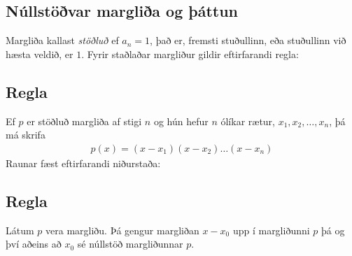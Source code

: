 \documentclass[a4paper,10pt,icelandic]{sphinxmanual}
\begin{document}
\subsection{Núllstöðvar margliða og þáttun}
\label{\detokenize{Kafli06:nullstovar-marglia-og-attun}}
Margliða kallast \textit{stöðluð} ef \(a_n=1\), það er, fremsti stuðullinn, eða stuðullinn við hæsta veldið, er \(1\). Fyrir staðlaðar margliður gildir eftirfarandi regla:


\subsection{Regla}
\label{\detokenize{Kafli06:id3}}
Ef \(p\) er stöðluð margliða af stigi \(n\) og hún hefur \(n\) ólíkar rætur, \(x_1, x_2, \dots, x_n\), þá má skrifa
\begin{equation*}
\begin{split}p(x)=(x-x_1)(x-x_2) \dots (x-x_n)\end{split}
\end{equation*}
Raunar fæst eftirfarandi niðurstaða:


\subsection{Regla}
\label{\detokenize{Kafli06:id4}}
Látum \(p\) vera margliðu. Þá gengur margliðan \(x-x_0\) upp í margliðunni \(p\) þá og því aðeins að \(x_0\) sé núllstöð margliðunnar \(p\).
\end{document}
